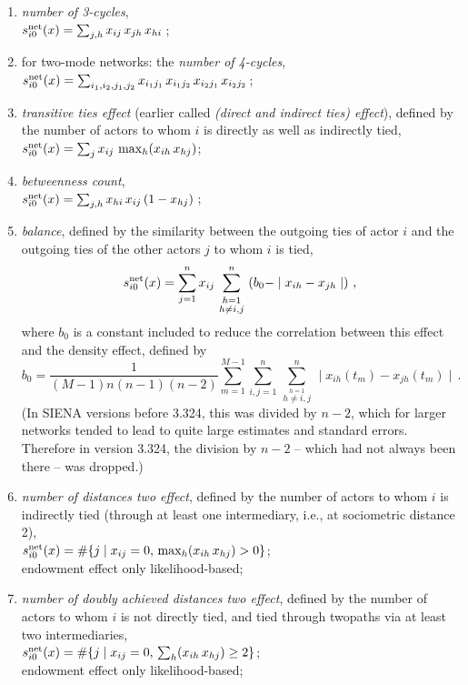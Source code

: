 \documentclass[a4paper,fleqn]{article}
\newcommand{\+}{\, + \,}
\newcommand{\neqsum}[3]
{\, \sum_{\stackrel{\scriptstyle #1 = 1}{\scriptstyle #2 \neq #3}}^n \,}
\newcommand{\vit}{\theenumi}
\newcommand{\SI}{{\sf SIENA }}
\begin{document}
{\begin{enumerate}
 \item {\em number of 3-cycles},\\
 $s^{\rm net}_{i\vit}(x) =  \sum_{j, h} x_{ij}\, x_{jh}\, x_{hi}\,$;


 \item for two-mode networks: the {\em number of 4-cycles},\\
 $s^{\rm net}_{i\vit}(x) =  \sum_{i_1, i_2, j_1, j_2}
            x_{i_1 j_1}\, x_{i_1 j_2}\, x_{i_2 j_1}\, x_{i_2 j_2}\,$;


 \item {\em transitive ties effect} (earlier called \emph{(direct and indirect ties) effect}),
 defined by
 the number of actors to whom $i$ is directly as well as indirectly tied,\\
 $s^{\rm net}_{i\vit}(x) =  \sum_j x_{ij} \, \max_h (x_{ih}\, x_{hj}) $;

 \item {\em betweenness count},\\
 $s^{\rm net}_{i\vit}(x) =  \sum_{j, h} x_{hi}\, x_{ij}\, (1-x_{hj})\,$;

 \item {\em balance}, defined by the similarity between the outgoing ties
 of actor $i$ and the outgoing ties of the other actors $j$ to whom
 $i$ is tied,
 \[ s^{\rm net}_{i\vit}(x) = \sum_{j=1}^n x_{ij} \neqsum{h}{h}{i,j}
 \left( b_0 - \mid x_{ih} - x_{jh} \mid \right)\, , \]
 where $b_0$ is a constant included to reduce the correlation
 between this effect and the density effect,
 \hypertarget{T_meanbal}{defined by}
 \[ b_0 = \frac{1}{(M-1)n(n-1)(n-2)} \sum_{m=1}^{M-1}
 \sum_{i, j=1}^n \neqsum{h}{h}{i,j}
 \mid x_{ih}(t_m) - x_{jh}(t_m) \mid \,.\]
 (In \SI versions before 3.324, this was divided by $n-2$, which for larger networks
 tended to lead to quite large estimates and standard errors.
 Therefore in version 3.324, the division by $n-2$
 -- which had not always been there -- was dropped.)

 \item {\em number of distances two effect},
 \hypertarget{T_dist2}{defined by}
 the number of actors to whom $i$ is indirectly tied
 (through at least one intermediary, i.e., at sociometric distance 2),\\
 $s^{\rm net}_{i\vit}(x) =  \#\{j \mid x_{ij} = 0,\, \max_h (x_{ih}\, x_{hj}) > 0 \}$;\\
 endowment effect only likelihood-based;

 \item {\em number of doubly achieved distances two effect},
 defined by
 the number of actors to whom $i$
 is not directly tied, and tied through twopaths via at least two intermediaries,\\
 $s^{\rm net}_{i\vit}(x) =  \#\{j \mid x_{ij} = 0,\, \sum_h (x_{ih}\, x_{hj}) \geq 2 \}$;\\
 endowment effect only likelihood-based;



\end{enumerate}}
\end{document}

